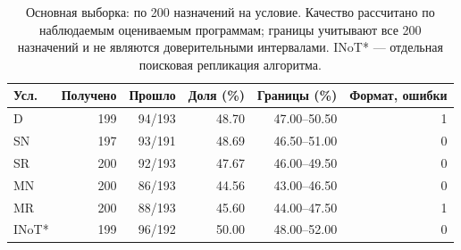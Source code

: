 \begin{table}[htbp]\centering\small
\caption{Основная выборка: по 200 назначений на условие. Качество рассчитано по наблюдаемым оцениваемым программам; границы учитывают все 200 назначений и не являются доверительными интервалами. INoT* --- отдельная поисковая репликация алгоритма.}\label{tab:heldout-quality}
\begin{tabular}{lrrrrr}\toprule
Усл. & Получено & Прошло & Доля (\%) & Границы (\%) & Формат, ошибки\\
\midrule
D & 199 & 94/193 & 48.70 & 47.00--50.50 & 1\\
SN & 197 & 93/191 & 48.69 & 46.50--51.00 & 0\\
SR & 200 & 92/193 & 47.67 & 46.00--49.50 & 0\\
MN & 200 & 86/193 & 44.56 & 43.00--46.50 & 0\\
MR & 200 & 88/193 & 45.60 & 44.00--47.50 & 1\\
INoT* & 199 & 96/192 & 50.00 & 48.00--52.00 & 0\\
\bottomrule\end{tabular}\end{table}
